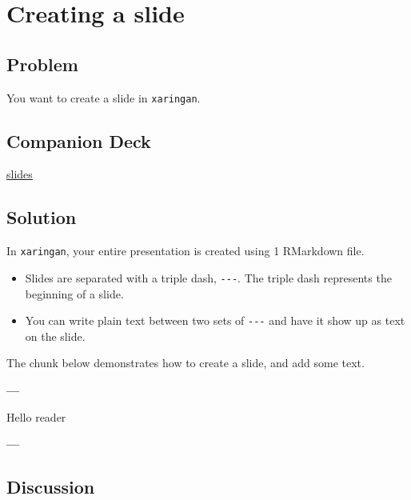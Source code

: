 \documentclass[]{book}
\newenvironment{Shaded}{\begin{snugshade}}{\end{snugshade}}
\newcommand{\NormalTok}[1]{#1}
\newcommand{\OperatorTok}[1]{\textcolor[rgb]{0.81,0.36,0.00}{\textbf{#1}}}
\theoremstyle{definition}
\theoremstyle{definition}
\theoremstyle{definition}
\theoremstyle{remark}
\begin{document}
\hypertarget{creating-a-slide}{%
\chapter{Creating a slide}\label{creating-a-slide}}

\hypertarget{problem-2}{%
\section{Problem}\label{problem-2}}

You want to create a slide in \texttt{xaringan}.

\hypertarget{companion-deck-2}{%
\section{Companion Deck}\label{companion-deck-2}}

\href{http://xaringan-field-guide-companion.davisvaughan.com/03-creating-a-slide/creating-a-slide.html\#1}{slides}

\hypertarget{solution-2}{%
\section{Solution}\label{solution-2}}

In \texttt{xaringan}, your entire presentation is created using 1
RMarkdown file.

\begin{itemize}
\item
  Slides are separated with a triple dash, \texttt{-\/-\/-}. The triple
  dash represents the beginning of a slide.
\item
  You can write plain text between two sets of \texttt{-\/-\/-} and have
  it show up as text on the slide.
\end{itemize}

The chunk below demonstrates how to create a slide, and add some text.

\begin{Shaded}
\begin{Highlighting}[]
\OperatorTok{---}

\NormalTok{Hello reader}

\OperatorTok{---}
\end{Highlighting}
\end{Shaded}

\hypertarget{discussion-2}{%
\section{Discussion}\label{discussion-2}}
\end{document}
